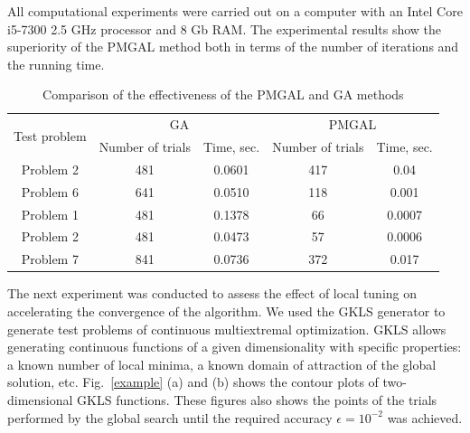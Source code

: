\documentclass[
11pt,%
tightenlines,%
twoside,%
onecolumn,%
nofloats,%
nobibnotes,%
nofootinbib,%
superscriptaddress,%
noshowpacs,%
centertags]%
{revtex4}
\begin{document}
All computational experiments were carried out on a computer with an Intel Core i5-7300 2.5 GHz processor and 8 Gb RAM. The experimental results show the superiority of the PMGAL method both in terms of the number of iterations and the running time.

\begin{table}[ht]
	\caption{Comparison of the effectiveness of the PMGAL and GA methods}
	\label{tab:1}
	\center
	\begin{tabular}{|c|c|c|c|c|}
		\hline
	\multirow{2}{*}{Test problem}	 & \multicolumn{2}{c|}{ GA } &  \multicolumn{2}{c|}{PMGAL} \\
		\cline{2-3} \cline{4-5} 
		 & Number of trials & Time, sec. &  Number of trials & Time, sec.  \\
		\hline 
		 Problem 2 \cite{Floudas}&	481 &	0.0601 & 	417 &	0.04 \\
		 Problem 6 \cite{Floudas}&	641 &	0.0510 & 	118 &	0.001 \\
		 Problem 1 \cite{Deep}   &	481 &	0.1378 & 	66 &	0.0007 \\
		 Problem 2 \cite{Deep}   &	481 &	0.0473 & 	57 &	0.0006 \\
		 Problem 7 \cite{Deep}   &	841 &	0.0736 &  372	 &	0.017 \\
		\hline
	\end{tabular}
\end{table}	


The next experiment was conducted to assess the effect of local tuning on accelerating the convergence of the algorithm. We used the GKLS generator \cite{Gaviano} to generate test problems of continuous multiextremal optimization. GKLS allows generating continuous functions of a given dimensionality with specific properties: a known number of local minima, a known domain of attraction of the global solution, etc.  
Fig.~\ref{example} (a) and (b) shows the contour plots of two-dimensional GKLS functions. These figures also shows the points of the trials performed by the global search until the required accuracy $\epsilon=10^{-2}$ was achieved.
\end{document}
